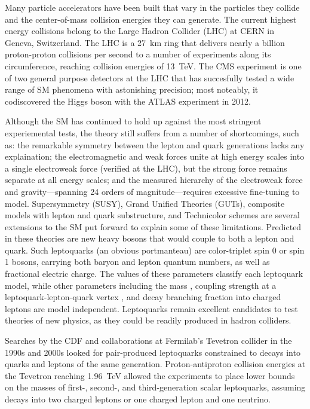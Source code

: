 Many particle accelerators have been built that vary in the particles they collide and the center-of-mass collision energies they can generate. The current highest energy collisions belong to the Large Hadron Collider (LHC) at CERN in Geneva, Switzerland. The LHC is a \SI{27}{\km} ring that delivers nearly a billion proton-proton collisions per second to a number of experiments along its circumference, reaching collision energies of \SI{13}{\TeV}. The CMS experiment is one of two general purpose detectors at the LHC that has succesfully tested a wide range of SM phenomena with astonishing precision; most noteably, it codiscovered the Higgs boson with the ATLAS experiment in 2012.

Although the SM has continued to hold up against the most stringent experiemental tests, the theory still suffers from a number of shortcomings, such as: the remarkable symmetry between the lepton and quark generations lacks any explaination; the electromagnetic and weak forces unite at high energy scales into a single electroweak force (verified at the LHC), but the strong force remains separate at all energy scales; and the measured hierarchy of the electroweak force and gravity---spanning 24 orders of magnitude---requires excessive fine-tuning to model. Supersymmetry (SUSY), Grand Unified Theories (GUTs), composite models with lepton and quark substructure, and Technicolor schemes are several extensions to the SM put forward to explain some of these limitations. Predicted in these theories are new heavy bosons that would couple to both a lepton and quark. Such leptoquarks (an obvious portmanteau) are color-triplet spin 0 or spin 1 bosons, carrying both baryon and lepton quantum numbers, as well as fractional electric charge. The values of these parameters classify each leptoquark model, while other parameters including the mass \MLQ, coupling strength at a leptoquark-lepton-quark vertex \lambdaLQ, and decay branching fraction into charged leptons \bfu are model independent. Leptoquarks remain excellent candidates to test theories of new physics, as they could be readily produced in hadron colliders.

Searches by the CDF and \DZERO collaborations at Fermilab's Tevetron collider in the 1990s and 2000s looked for pair-produced leptoquarks constrained to decays into quarks and leptons of the same generation. Proton-antiproton collision energies at the Tevetron reaching \SI{1.96}{\TeV} allowed the experiments to place lower bounds on the masses of first-, second-, and third-generation scalar leptoquarks, assuming decays into two charged leptons or one charged lepton and one neutrino.

